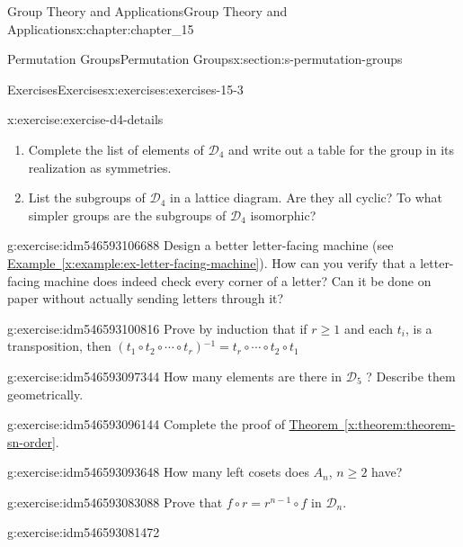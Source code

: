 \documentclass[oneside,10pt,]{book}
\newcommand{\xreffont}{\relax}
\numberwithin{equation}{section}
\begin{document}
\begin{chapterptx}{Group Theory and Applications}{}{Group Theory and Applications}{}{}{x:chapter:chapter_15}
\begin{sectionptx}{Permutation Groups}{}{Permutation Groups}{}{}{x:section:s-permutation-groups}
\begin{exercises-subsection}{Exercises}{}{Exercises}{}{}{x:exercises:exercises-15-3}
\begin{divisionexercise}{5}{}{}{x:exercise:exercise-d4-details}%
%
\begin{enumerate}[label=(\alph*)]
\item{}Complete the list of elements of \(\mathcal{D}_4\) and write out a table for the group in its realization as symmetries.%
\item{}List the subgroups of \(\mathcal{D}_4\) in a lattice diagram. Are they all cyclic? To what simpler groups are the subgroups of \(\mathcal{D}_4\) isomorphic?%
\end{enumerate}
%
\end{divisionexercise}%
\begin{divisionexercise}{6}{}{}{g:exercise:idm546593106688}%
Design a better letter-facing machine (see \hyperref[x:example:ex-letter-facing-machine]{Example~{\xreffont\ref{x:example:ex-letter-facing-machine}}}). How can you verify that a letter-facing machine does indeed check every corner of a letter? Can it be done on paper without actually sending letters through it?%
\end{divisionexercise}%
\begin{divisionexercise}{7}{}{}{g:exercise:idm546593100816}%
Prove by induction that if \(r \geq  1\) and each \(t_i\), is a transposition, then  \(\left(t_1\circ t_2\circ \cdots \circ t_r\right){}^{-1}=t_r\circ \cdots \circ t_2\circ t_1\)%
\end{divisionexercise}%
\begin{divisionexercise}{8}{}{}{g:exercise:idm546593097344}%
How many elements are there in \(\mathcal{D}_5\) ? Describe them geometrically.%
\end{divisionexercise}%
\begin{divisionexercise}{9}{}{}{g:exercise:idm546593096144}%
Complete the proof of \hyperref[x:theorem:theorem-sn-order]{Theorem~{\xreffont\ref{x:theorem:theorem-sn-order}}}.%
\end{divisionexercise}%
\begin{divisionexercise}{10}{}{}{g:exercise:idm546593093648}%
How many left cosets does \(A_n\), \(n\geq 2\) have?%
\end{divisionexercise}%
\begin{divisionexercise}{11}{}{}{g:exercise:idm546593083088}%
Prove that  \(f\circ r= r^{n-1}\circ f\) in \(\mathcal{D}_n\).%
\end{divisionexercise}%
\begin{divisionexercise}{12}{}{}{g:exercise:idm546593081472}%
%
\begin{enumerate}[label=(\alph*)]

\end{enumerate}
\end{divisionexercise}
\end{exercises-subsection}
\end{sectionptx}
\end{chapterptx}
\end{document}

